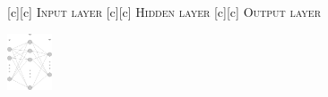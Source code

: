 [c][c] {\scriptsize \textsc{Input layer}}
[c][c] {\scriptsize \textsc{Hidden layer}}
[c][c] {\scriptsize \textsc{Output layer}}

\includegraphics[width=0.1\textwidth]{ann.eps}